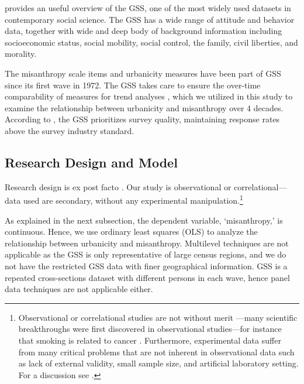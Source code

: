 \documentclass[11pt, letterpaper]{article}
\begin{document}
\begin{spacing}{1.4}
\citet{marsden20} provides an useful overview  of the GSS, one of the most
widely used datasets in contemporary social science. The GSS has a wide range of
attitude and behavior data, together with  wide and deep body of background
information including socioeconomic status, social mobility,
social control, the family, civil liberties, and morality. %
%

The misanthropy scale items and urbanicity
measures have been part of GSS since its first wave in 1972. 
 The GSS takes care to ensure the over-time comparability of measures for trend analyses \citep{marsden20}, which we utilized in this study to examine the relationship between urbanicity and misanthropy over 4 decades. According to \citet{marsden20}, the GSS prioritizes survey quality, maintaining response rates above the survey industry standard.

\subsection*{Research Design and Model}

Research design is  ex post facto \citep{mohr95}. Our study is observational or correlational---data used are secondary, without any experimental manipulation.\footnote{Observational or correlational studies are not
without merit%
---many scientific breakthroughs were first
discovered in observational studies---for instance that smoking is
related to cancer \citep[e.g.,][]{blanchflower11,oswald14}.
 Furthermore, experimental data %
 suffer from many critical problems that are not inherent in
observational data such as lack of external validity, small sample size, and  
artificial laboratory setting. %
For a discussion see \citet{pawson97}.}

As explained in the next subsection, the dependent variable, `misanthropy,' is
continuous. Hence, we  use ordinary least squares (OLS) to analyze the
relationship between urbanicity and  misanthropy.
Multilevel techniques are not applicable  as the GSS is only representative of
large census regions, and we do not have the restricted GSS data with finer
geographical information.
 GSS is a repeated cross-sections dataset with different persons in each wave, hence
 panel data techniques are not applicable either. 


\end{spacing}
\end{document}
